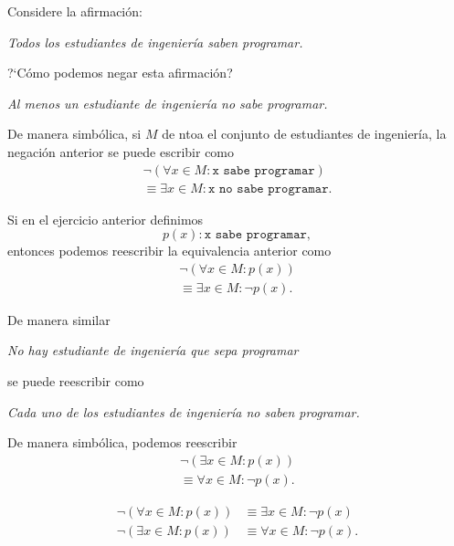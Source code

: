  Considere la afirmaci\'on:
 \begin{center}
  \emph{Todos los estudiantes de ingenier\'ia saben programar.}
 \end{center}
?`C\'omo podemos negar esta afirmaci\'on?


\begin{center}
 \emph{Al menos un estudiante de ingenier\'ia no sabe programar.}
\end{center} 



 De manera simb\'olica, si $M$ de ntoa el conjunto de estudiantes de ingenier\'ia, la negaci\'on anterior se puede escribir como
\begin{align*}
  \neg\left( \forall x\in M: \texttt{x sabe programar} \right)\\ \equiv \exists x\in M: \texttt{x no sabe programar.}
\end{align*}




 Si en el ejercicio anterior definimos $$p(x):\texttt{x sabe programar},$$ entonces podemos reescribir la equivalencia anterior como
 \begin{align*}
  \neg\left( \forall x\in M: p(x) \right)\\ \equiv \exists x\in M: \neg p(x).
\end{align*}



 De manera similar
 \begin{center}
  \emph{No hay estudiante de ingenier\'ia que sepa programar}
 \end{center}
 se puede reescribir como
 \begin{center}
  \emph{Cada uno de los estudiantes de ingenier\'ia no saben programar.}
 \end{center}





 De manera simb\'olica, podemos reescribir
  \begin{align*}
  \neg\left( \exists x\in M: p(x) \right)\\ \equiv \forall x\in M: \neg p(x).
\end{align*}



 \begin{thm}[DeMorgan]
  \begin{align}
  \label{lip:thm:4.4}
   \neg\left( \forall x\in M: p(x) \right)& \equiv \exists x\in M: \neg p(x)\\
   \label{lip:thm:4.5}
   \neg\left( \exists x\in M: p(x) \right)& \equiv \forall x\in M: \neg p(x).
  \end{align}

 \end{thm}




